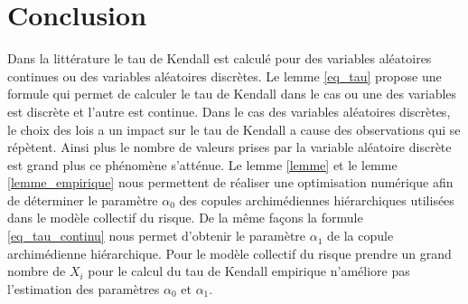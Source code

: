 \documentclass{article}
\begin{document}
	\section{Conclusion}
	Dans la littérature le tau de Kendall est calculé pour des variables aléatoires continues ou des variables aléatoires discrètes. Le lemme \ref{eq_tau} propose une formule qui permet de calculer le tau de Kendall dans le cas ou une des variables est discrète et l'autre est continue.
	Dans le cas des variables aléatoires discrètes, le choix des lois a un impact sur le tau de Kendall a cause des observations qui se répètent. Ainsi plus le nombre de valeurs prises par la variable aléatoire discrète est grand plus ce phénomène s'atténue.
	Le lemme \ref{lemme} et le lemme \ref{lemme_empirique} nous permettent de réaliser une optimisation numérique afin de déterminer le paramètre $\alpha_0$ des copules archimédiennes hiérarchiques utilisées dans le modèle collectif du risque. 
	De la même façons la formule \ref{eq_tau_continu} nous permet d'obtenir le paramètre $\alpha_{1}$ de la copule archimédienne hiérarchique. Pour le modèle collectif du risque prendre un grand nombre de $X_i$ pour le calcul du tau de Kendall empirique n'améliore pas l'estimation des paramètres $\alpha_0$ et $\alpha_1$.


	\newpage
	
	
	 
	 
\end{document}
